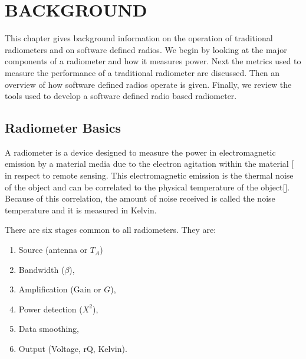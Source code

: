 
\chapter{BACKGROUND}\label{ch:background}
This chapter gives background information on the operation of  traditional radiometers and on software defined radios.  We begin by looking at the major components of a radiometer and how it measures power.  Next the metrics used to measure the performance of a traditional radiometer are discussed.  Then an overview of how software defined radios operate is given.  Finally, we review the tools used to develop a software defined radio based radiometer.  

\section{Radiometer Basics}\label{rad_basics}
A radiometer is a device designed to measure the power in electromagnetic emission by a material media due to the electron agitation within the material [\cite{ulaby} in respect to remote sensing.  This electromagnetic emission is the thermal noise of the object and can be correlated to the physical temperature of the object[\cite{Nyquist1928thermal}].  Because of this correlation, the amount of noise received is called the noise temperature and it is measured in Kelvin. 

There are six stages common to all radiometers.  They are:

\begin{enumerate}
\item Source (antenna or $T_{A}$)
\item Bandwidth ($\beta$),
\item Amplification (Gain or $G$),
\item Power detection ($X^{2}$),
\item Data smoothing,
\item Output (Voltage, rQ, Kelvin).
\end{enumerate}

